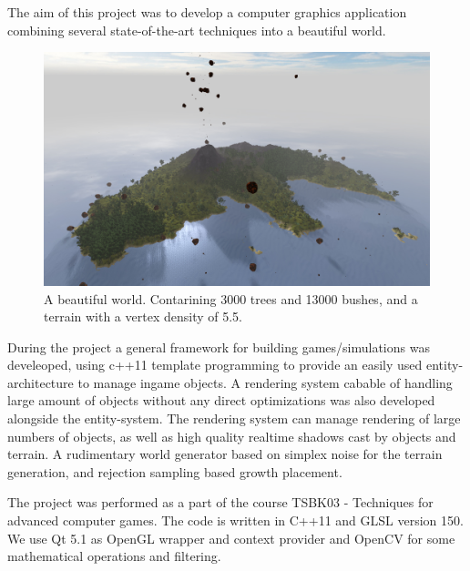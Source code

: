 The aim of this project was to develop a computer graphics application combining several state-of-the-art techniques into a beautiful world.
\begin{figure}[H]
  \centering
  \includegraphics[width=1.0\linewidth]{images/frontImage.jpg}
  \caption{A beautiful world. Contarining 3000 trees and 13000 bushes, and a terrain with a vertex density of 5.5.}
  \label{fig:beautifulIsland}
\end{figure}%

During the project a general framework for building games/simulations was develeoped, using c++11 template programming to provide an easily used entity-architecture to manage ingame objects. A rendering system cabable of handling large amount of objects without any direct optimizations was also developed alongside the entity-system. The rendering system can manage rendering of large numbers of objects, as well as high quality realtime shadows cast by objects and terrain. A rudimentary world generator based on simplex noise for the terrain generation, and rejection sampling based growth placement.


The project was performed as a part of the course TSBK03 - Techniques for advanced computer games. The code is written in C++11 and GLSL version 150. We use Qt 5.1 as OpenGL wrapper and context provider and OpenCV for some mathematical operations and filtering.
